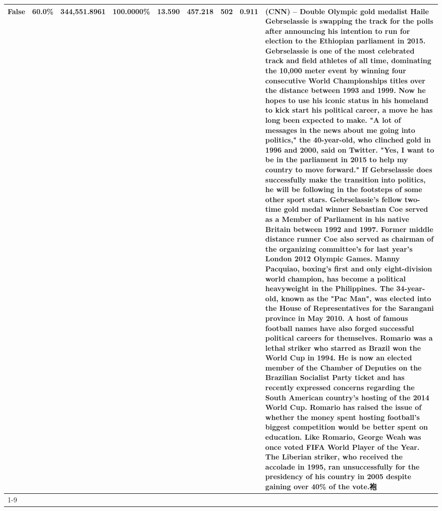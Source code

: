 \begin{table}[H]
{\begin{tabular}{lllrlllll}
False & 60.0\% & 344,551.8961 & \bfseries \color{red} 100.0000\% & 13.590 & 457.218 & 502 & 0.911 & (CNN) -- Double Olympic gold medalist Haile Gebrselassie is swapping the track for the polls after announcing his intention to run for election to the Ethiopian parliament in 2015. Gebrselassie is one of the most celebrated track and field athletes of all time, dominating the 10,000 meter event by winning four consecutive World Championships titles over the distance between 1993 and 1999. Now he hopes to use his iconic status in his homeland to kick start his political career, a move he has long been expected to make. "A lot of messages in the news about me going into politics," the 40-year-old, who clinched gold in 1996 and 2000, said on Twitter. "Yes, I want to be in the parliament in 2015 to help my country to move forward." If Gebrselassie does successfully make the transition into politics, he will be following in the footsteps of some other sport stars. Gebrselassie's fellow two-time gold medal winner Sebastian Coe served as a Member of Parliament in his native Britain between 1992 and 1997. Former middle distance runner Coe also served as chairman of the organizing committee's for last year's London 2012 Olympic Games. Manny Pacquiao, boxing's first and only eight-division world champion, has become a political heavyweight in the Philippines. The 34-year-old, known as the "Pac Man", was elected into the House of Representatives for the Sarangani province in May 2010. A host of famous football names have also forged successful political careers for themselves. Romario was a lethal striker who starred as Brazil won the World Cup in 1994. He is now an elected member of the Chamber of Deputies on the Brazilian Socialist Party ticket and has recently expressed concerns regarding the South American country's hosting of the 2014 World Cup. Romario has raised the issue of whether the money spent hosting football's biggest competition would be better spent on education. Like Romario, George Weah was once voted FIFA World Player of the Year. The Liberian striker, who received the accolade in 1995, ran unsuccessfully for the presidency of his country in 2005 despite gaining over 40\% of the vote.袍 \\
\cline{1-9}

\end{tabular}}
\end{table}
